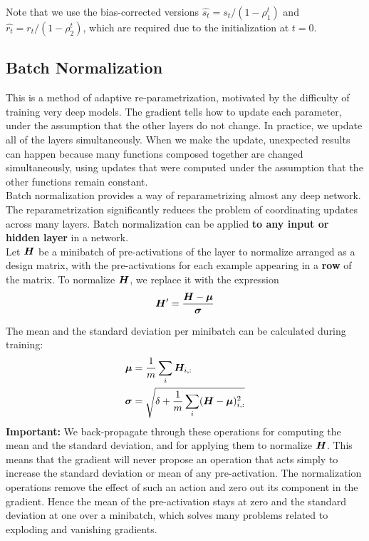 \begin{multicols}{2}
		Note that we use the bias-corrected versions $ \hat{s_{t}} = s_{t} / (1 - \rho_{1}^{t}) $ and $ \hat{r_{t}} = r_{t} / (1 - \rho_{2}^{t}) $, which are required due
		to the initialization at $ t = 0 $.

	\subsection{Batch Normalization}
	This is a method of adaptive re-parametrization, motivated by the difficulty of training very deep models.
	The gradient tells how to update each parameter, under the assumption that the other layers do not change.
	In practice, we update all of the layers simultaneously.
	When we make the update, unexpected results can happen because many functions composed together are changed simultaneously, using updates that were computed under the assumption that the other functions remain constant.\\

	Batch normalization provides a way of reparametrizing almost any deep network.
	The reparametrization significantly reduces the problem of coordinating updates across many layers.
	Batch normalization can be applied \textbf{to any input or hidden layer} in a network.\\

	Let ${\bm{H}}$ be a minibatch of pre-activations of the layer to normalize arranged as a design matrix, with the pre-activations for each example appearing in a \textbf{row} of the matrix.
	To normalize ${\bm{H}}$, we replace it with the expression
	\[ \mH'=\frac{\mH - \vmu}{\bol{\sigma}} \]

	The mean and the standard deviation per minibatch can be calculated during training:
	\begin{align*}
	\vmu &= \frac{1}{m}\sum_i\mH_{i,:}\\
	\bol{\sigma} &= \sqrt{\delta+\frac{1}{m}\sum_i (\mH-\vmu)_{i,:}^2}
	\end{align*}
	\textbf{Important:}
	We back-propagate through these operations for computing the mean and the standard deviation, and for applying them to normalize ${\bm{H}}$. This means that the gradient will never propose an operation that acts simply to increase the standard deviation or mean of any pre-activation. The normalization operations remove the effect of such an action and zero out its component in the gradient. Hence the mean of the pre-activation stays at zero and the standard deviation at one over a minibatch, which solves many problems related to exploding and vanishing gradients.



\end{multicols}

